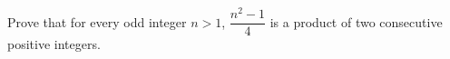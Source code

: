 Prove that for every odd integer $n>1$, $\dfrac{n^2-1}{4}$ is a product of two consecutive positive integers.
